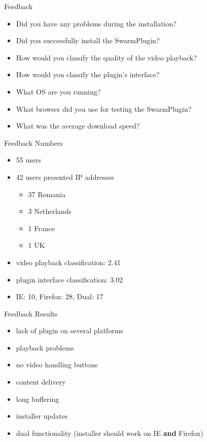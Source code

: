 \documentclass{beamer}
\begin{document}
\begin{frame}{Feedback}
  \begin{itemize}
    \item Did you have any problems during the installation?
    \item Did you successfully install the SwarmPlugin?
    \item How would you classify the quality of the video playback?
    \item How would you classify the plugin's interface?
    \item What OS are you running?
    \item What browser did you use for testing the SwarmPlugin?
    \item What was the average download speed?
  \end{itemize}
\end{frame}

\begin{frame}{Feedback Numbers}
  \begin{itemize}
    \item 55 users
    \item 42 users presented IP addresses
      \begin{itemize}
        \item 37 Romania
        \item 3 Netherlands
        \item 1 France
        \item 1 UK
      \end{itemize}
    \item video playback classification: 2.41
    \item plugin interface classification: 3.02
    \item IE: 10, Firefox: 28, Dual: 17
  \end{itemize}
\end{frame}

\begin{frame}{Feedback Results}
  \begin{itemize}
    \item lack of plugin on several platforms
    \item playback problems
    \item no video handling buttons
    \item content delivery
    \item long buffering
    \item installer updates
    \item dual functionality (installer should work on IE \textbf{and} Firefox)
  \end{itemize}
\end{frame}
\end{document}
